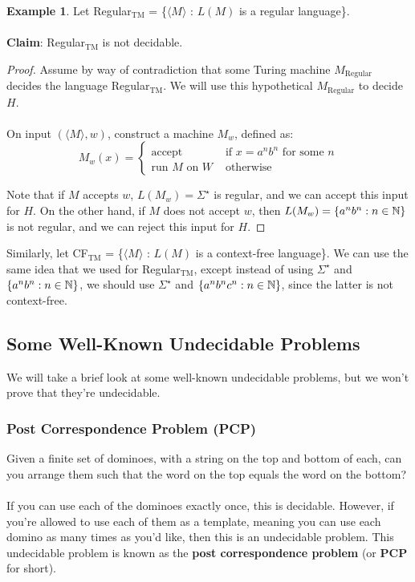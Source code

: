 \documentclass[]{article}
\DeclarePairedDelimiter{\set}{\lbrace}{\rbrace}
\theoremstyle{definition}
\newtheorem{ex}{Example}[section]
\newcommand{\lecture}[1]{\marginpar{{\footnotesize $\leftarrow$ \underline{#1}}}}
\begin{document}
      \lecture{November 28, 2013}
      \begin{ex}
        Let Regular$_\text{TM}$ = \{$\langle M \rangle$ : $L(M)$ is a regular language\}.
        \\ \\
        \textbf{Claim}: Regular$_\text{TM}$ is not decidable.

        \begin{proof}
          Assume by way of contradiction that some Turing machine $M_\text{Regular}$ decides the language Regular$_\text{TM}$. We will use this hypothetical $M_\text{Regular}$ to decide $H$.
          \\ \\
          On input $(\langle M \rangle, w)$, construct a machine $M_w$, defined as:
          $$
            M_w(x) = \begin{cases}
              \text{accept} & \text{ if } x = a^n b^n \text{ for some } n \\
              \text{run } M \text{ on } W & \text{ otherwise}
            \end{cases}
          $$

          Note that if $M$ accepts $w$, $L(M_w) = \Sigma^\star$ is regular, and we can accept this input for $H$. On the other hand, if $M$ does not accept $w$, then $L(M_w) = \set{ a^n b^n : n \in \mathbb{N} }$ is not regular, and we can reject this input for $H$.
        \end{proof}

        Similarly, let CF$_\text{TM}$ = \{$\langle M \rangle$ : $L(M)$ is a context-free language\}. We can use the same idea that we used for Regular$_\text{TM}$, except instead of using $\Sigma^\star$ and $\set{a^n b^n : n \in \mathbb{N} }$, we should use $\Sigma^\star$ and $\set{a^n b^n c^n : n \in \mathbb{N} }$, since the latter is not context-free.
      \end{ex}

    \subsection{Some Well-Known Undecidable Problems}
      We will take a brief look at some well-known undecidable problems, but we won't prove that they're undecidable.

      \subsubsection{Post Correspondence Problem (PCP)}
        Given a finite set of dominoes, with a string on the top and bottom of each, can you arrange them such that the word on the top equals the word on the bottom?
        \\ \\
        If you can use each of the dominoes exactly once, this is decidable. However, if you're allowed to use each of them as a template, meaning you can use each domino as many times as you'd like, then this is an undecidable problem. This undecidable problem is known as the \textbf{post correspondence problem} (or \textbf{PCP} for short).
\end{document}
